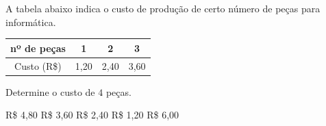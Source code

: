 A tabela abaixo indica o custo de produção de certo número de peças para informática.

\begin{tabular}{|c|c|c|c|}\hline
nº de peças & 1 & 2 & 3 \\\hline
Custo (R\$) & 1{,}20 & 2{,}40 & 3{,}60 \\\hline
\end{tabular}

Determine o custo de $4$ peças.

R\$ 4{,}80
R\$ 3{,}60
R\$ 2{,}40
R\$ 1{,}20
R\$ 6{,}00




